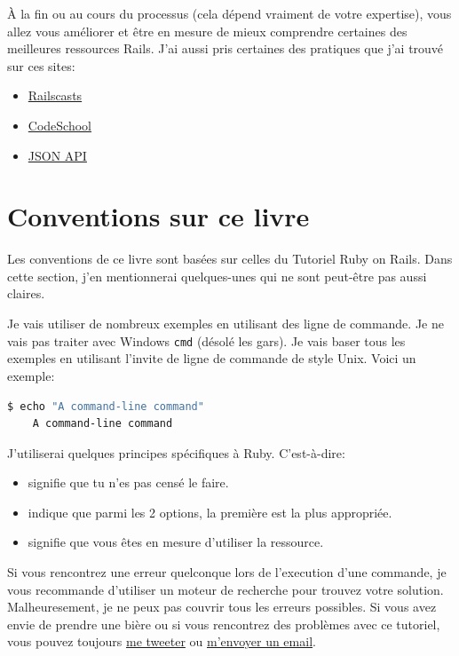 \documentclass[]{report}
\begin{document}
  À la fin ou au cours du processus (cela dépend vraiment de votre expertise), vous allez vous améliorer et être en mesure de mieux comprendre certaines des meilleures ressources Rails. J'ai aussi pris certaines des pratiques que j'ai trouvé sur ces sites:

  \begin{itemize}
    \item \href{http://railscasts.com/}{Railscasts}
    \item \href{http://codeschool.com/}{CodeSchool}
    \item \href{http://jsonapi.org/format/}{JSON API}
  \end{itemize}

  \section{Conventions sur ce livre}

    Les conventions de ce livre sont basées sur celles du Tutoriel Ruby on Rails. Dans cette section, j'en mentionnerai quelques-unes qui ne sont peut-être pas aussi claires.

    Je vais utiliser de nombreux exemples en utilisant des ligne de commande. Je ne vais pas traiter avec Windows \verb|cmd| (désolé les gars). Je vais baser tous les exemples en utilisant l'invite de ligne de commande de style Unix. Voici un exemple:

    \begin{scriptsize}
    \begin{lstlisting}[language=bash]
    $ echo "A command-line command"
    A command-line command
    \end{lstlisting}
    \end{scriptsize}

    J'utiliserai quelques principes spécifiques à Ruby. C'est-à-dire:

    \begin{itemize}
      \item {} signifie que tu n'es pas censé le faire.
      \item {} indique que parmi les 2 options, la première est la plus appropriée.
      \item {} signifie que vous êtes en mesure d'utiliser la ressource.
    \end{itemize}

    Si vous rencontrez une erreur quelconque lors de l'execution d'une commande, je vous recommande d'utiliser un moteur de recherche pour trouvez votre solution. Malheuresement, je ne peux pas couvrir tous les erreurs possibles. Si vous avez envie de prendre une bière ou si vous rencontrez des problèmes avec ce tutoriel, vous pouvez toujours \href{http://twitter.com/kurenn}{me tweeter} ou \href{mailto:contact@rousseau-alexandre.fr}{m'envoyer un email}.
\end{document}
